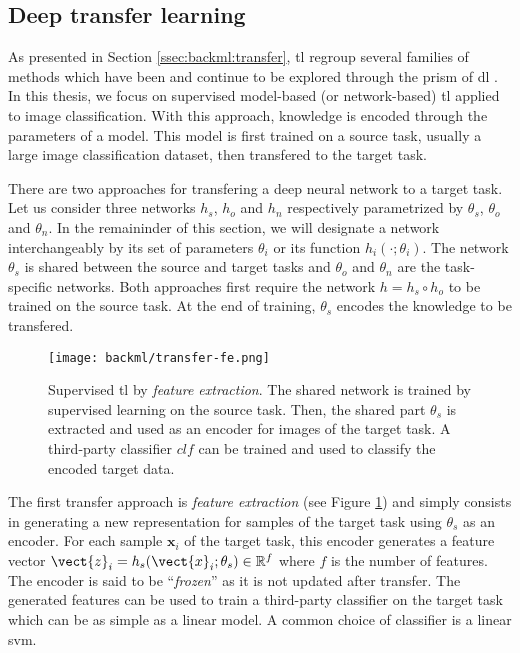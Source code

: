 \subsection{Deep transfer learning}
\label{ssec:backml:dl:deeptransfer}

As presented in Section \ref{ssec:backml:transfer}, \acrlong{tl} regroup several families of methods which have been and continue to be explored through the prism of \acrlong{dl} \parencite{tan2018survey}. In this thesis, we focus on supervised model-based (or network-based) \acrlong{tl} applied to image classification. With this approach, knowledge is encoded through the parameters of a model. This model is first trained on a source task, usually a large image classification dataset, then transfered to the target task.

There are two approaches for transfering a deep neural network to a target task. Let us consider three networks $h_s$, $h_o$ and $h_n$ respectively parametrized by $\theta_s$, $\theta_o$ and $\theta_n$. In the remaininder of this section, we will designate a network interchangeably by its set of parameters $\theta_i$ or its function $h_i(\cdot;\theta_i)$. The network $\theta_s$ is shared between the source and target tasks and $\theta_o$ and $\theta_n$ are the task-specific networks. Both approaches first require the network $h = h_s \circ h_o$ to be trained on the source task. At the end of training, $\theta_s$ encodes the knowledge to be transfered. 

\begin{figure}
  \centering
  \texttt{[image: backml/transfer-fe.png]}
  \caption{Supervised \acrlong{tl} by \textit{feature extraction}. The shared network is trained by supervised learning on the source task. Then, the shared part $\theta_s$ is extracted and used as an encoder for images of the target task. A third-party classifier $clf$ can be trained and used to classify the encoded target data.}
  \label{fig:backml:transfer-fe}
\end{figure}

The first transfer approach is \textit{feature extraction} (see Figure \ref{fig:backml:transfer-fe}) and simply consists in generating a new representation for samples of the target task using $\theta_s$ as an encoder. For each sample $\mathbf{x}_i$ of the target task, this encoder generates a feature vector $\vect{z}_i = h_s(\vect{x}_i;\theta_s) \in \mathbb{R}^f$ where $f$ is the number of features. The encoder is said to be ``\textit{frozen}'' as it is not updated after transfer. The generated features can be used to train a third-party classifier on the target task which can be as simple as a linear model. A common choice of classifier is a linear \acrshort{svm}. 

